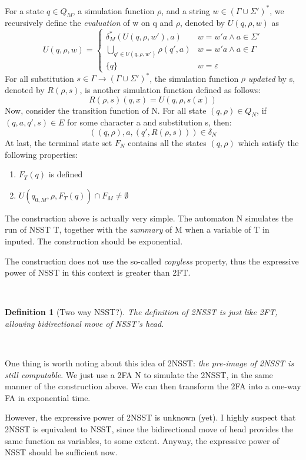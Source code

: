 \documentclass{article}
\newcommand{\tmtextit}[1]{{\itshape{#1}}}
\newtheorem{definition}{Definition}
{\theorembodyfont{\rmfamily}\newtheorem{note}{Note}}
{\theorembodyfont{\rmfamily}\newtheorem{remark}{Remark}}
\begin{document}
For a state $q \in Q_M$, a simulation function $\rho$, and a string $w \in
(\Gamma \cup \Sigma')^{\ast}$, we recursively define the \tmtextit{evaluation}
of w on q and $\rho$, denoted by $U (q, \rho, w)$ as
\[ U (q, \rho, w) = \left\{ \begin{array}{ll}
     \delta_M^{\ast} (U (q, \rho, w'), a) & w = w' a \wedge a \in \Sigma'\\
     \bigcup_{q' \in U (q, \rho, w')} \rho (q', a) & w = w' a \wedge a \in
     \Gamma\\
     \{ q \} & w = \varepsilon
   \end{array} \right. \]
For all substitution $s \in \Gamma \rightarrow (\Gamma \cup \Sigma')^{\ast}$,
the simulation function $\rho$ \tmtextit{updated} by s, denoted by $R (\rho,
s)$, is another simulation function defined as follows:
\[ R (\rho, s) (q, x) = U (q, \rho, s (x)) \]
Now, consider the transition function of N. For all state $(q, \rho) \in Q_N$,
if $(q, a, q', s) \in E$ for some character a and substitution s, then:
\[ ((q, \rho), a, (q', R (\rho, s))) \in \delta_N \]
At last, the terminal state set $F_N$ contains all the states $(q, \rho)$
which satisfy the following properties:
\begin{enumerate}
  \item $F_T (q)$ is defined
  
  \item $U (q_{0, M}, \rho, F_T (q)) \cap F_M \neq \emptyset$
\end{enumerate}


\begin{note}[Intuition]
  The construction above is actually very simple. The automaton N simulates
  the run of NSST T, together with the \tmtextit{summary} of M when a variable
  of T in inputed. The construction should be exponential.
  
  The construction does not use the so-called \tmtextit{copyless}
  property{\cite{alurExpressivenessStreamingString2010,alurNondeterministicStreamingString2011}},
  thus the expressive power of NSST in this context is greater than 2FT.
\end{note}

\

\begin{definition}[Two way NSST?]
  The definition of 2NSST is just like 2FT, allowing bidirectional move of
  NSST's head.
\end{definition}

\begin{note}
  \
  
  One thing is worth noting about this idea of 2NSST: \tmtextit{the pre-image
  of 2NSST is still computable}. We just use a 2FA N to simulate the 2NSST, in
  the same manner of the construction above. We can then transform the 2FA
  into a one-way FA in exponential time.
  
  However, the expressive power of 2NSST is unknown (yet). I highly suspect
  that 2NSST is equivalent to NSST, since the bidirectional move of head
  provides the same function as variables, to some extent. Anyway, the
  expressive power of NSST should be sufficient now.
\end{note}
\end{document}
